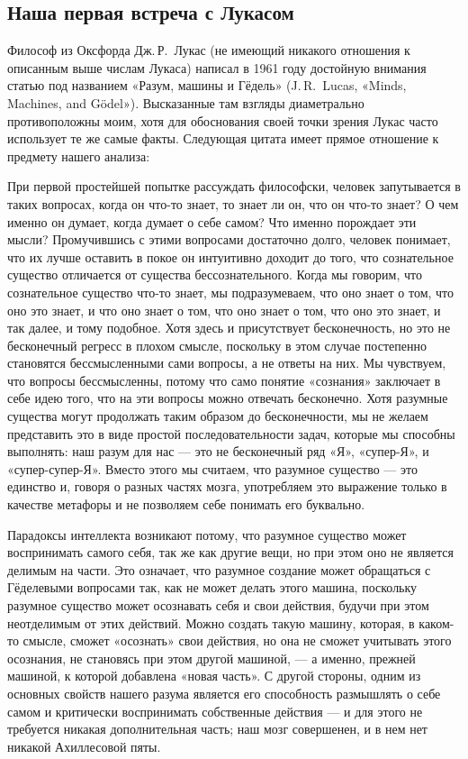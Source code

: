 \documentclass[../main.tex]{subfiles}
\begin{document}
\subsection{Наша первая встреча с Лукасом}

Философ из Оксфорда Дж.\,Р.~Лукас (не имеющий никакого отношения к описанным выше числам Лукаса) написал в 1961 году достойную внимания статью под названием «Разум, машины и Гёдель» (J.\,R.~Lucas, «Minds, Machines, and Gödel»). Высказанные там взгляды диаметрально противоположны моим, хотя для обоснования своей точки зрения Лукас часто использует те же самые факты. Следующая цитата имеет прямое отношение к предмету нашего анализа:

При первой простейшей попытке рассуждать философски, человек запутывается в таких вопросах, когда он что-то знает, то знает ли он, что он что-то знает? О чем именно он думает, когда думает о себе самом? Что именно порождает эти мысли? Промучившись с этими вопросами достаточно долго, человек понимает, что их лучше оставить в покое он интуитивно доходит до того, что сознательное существо отличается от существа бессознательного. Когда мы говорим, что сознательное существо что-то знает, мы подразумеваем, что оно знает о том, что оно это знает, и что оно знает о том, что оно знает о том, что оно это знает, и так далее, и тому подобное. Хотя здесь и присутствует бесконечность, но это не бесконечный регресс в плохом смысле, поскольку в этом случае постепенно становятся бессмысленными сами вопросы, а не ответы на них. Мы чувствуем, что вопросы бессмысленны, потому что само понятие «сознания» заключает в себе идею того, что на эти вопросы можно отвечать бесконечно. Хотя разумные существа могут продолжать таким образом до бесконечности, мы не желаем представить это в виде простой последовательности задач, которые мы способны выполнять: наш разум для нас --- это не бесконечный ряд «Я», «супер-Я», и «супер-супер-Я». Вместо этого мы считаем, что разумное существо --- это единство и, говоря о разных частях мозга, употребляем это выражение только в качестве метафоры и не позволяем себе понимать его буквально.

Парадоксы интеллекта возникают потому, что разумное существо может воспринимать самого себя, так же как другие вещи, но при этом оно не является делимым на части. Это означает, что разумное создание может обращаться с Гёделевыми вопросами так, как не может делать этого машина, поскольку разумное существо может осознавать себя и свои действия, будучи при этом неотделимым от этих действий. Можно создать такую машину, которая, в каком-то смысле, сможет «осознать» свои действия, но она не сможет учитывать этого осознания, не становясь при этом другой машиной, --- а именно, прежней машиной, к которой добавлена «новая часть». С другой стороны, одним из основных свойств нашего разума является его способность размышлять о себе самом и критически воспринимать собственные действия --- и для этого не требуется никакая дополнительная часть; наш мозг совершенен, и в нем нет никакой Ахиллесовой пяты.
\end{document}
